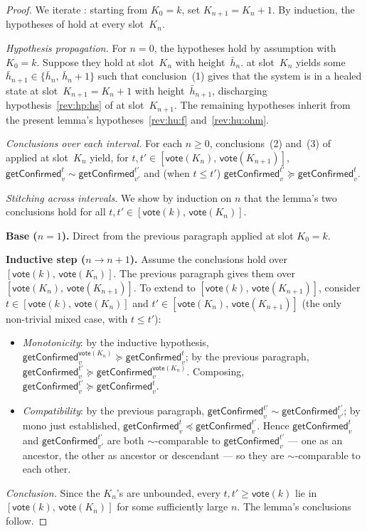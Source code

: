 \documentclass{article}
\newcommand{\vote}{\mathsf{vote}}
\newcommand{\comm}[1]{\bar{#1}}
\newcommand{\getConfirmed}{\textsf{getConfirmed}\xspace}
\theoremstyle{plain}
\theoremstyle{definition}
\theoremstyle{remark}
\begin{document}
\begin{proof}
We iterate : starting from $K_0 = k$, set $K_{n+1} = K_n + 1$. By induction, the hypotheses of  hold at every slot~$K_n$.

\emph{Hypothesis propagation.}
For $n = 0$, the hypotheses hold by assumption with $K_0 = k$. Suppose they hold at slot~$K_n$ with height~$\comm{h}_n$.  at slot~$K_n$ yields some $\comm{h}_{n+1} \in \{\comm{h}_n,\, \comm{h}_n + 1\}$ such that conclusion~(1) gives that the system is in a healed state at slot~$K_{n+1} = K_n + 1$ with height~$\comm{h}_{n+1}$, discharging hypothesis~\ref{rev:hp:hs} of  at slot~$K_{n+1}$. The remaining hypotheses inherit from the present lemma's hypotheses~\ref{rev:hu:f} and~\ref{rev:hu:ohm}.

\emph{Conclusions over each interval.}
For each $n \geq 0$, conclusions~(2) and~(3) of  applied at slot~$K_n$ yield, for $t, t' \in [\vote(K_n),\, \vote(K_{n+1})]$, $\getConfirmed_v^t \sim \getConfirmed_{v'}^{t'}$ and (when $t \leq t'$) $\getConfirmed_v^{t'} \succeq \getConfirmed_v^t$.

\emph{Stitching across intervals.}
We show by induction on $n$ that the lemma's two conclusions hold for all $t, t' \in [\vote(k),\, \vote(K_n)]$.

\textbf{Base ($n = 1$).}
Direct from the previous paragraph applied at slot $K_0 = k$.

\textbf{Inductive step ($n \to n+1$).}
Assume the conclusions hold over $[\vote(k),\, \vote(K_n)]$. The previous paragraph gives them over $[\vote(K_n),\, \vote(K_{n+1})]$. To extend to $[\vote(k),\, \vote(K_{n+1})]$, consider $t \in [\vote(k),\, \vote(K_n)]$ and $t' \in [\vote(K_n),\, \vote(K_{n+1})]$ (the only non-trivial mixed case, with $t \leq t'$):
\begin{itemize}
  \item \emph{Monotonicity}: by the inductive hypothesis, $\getConfirmed_v^{\vote(K_n)} \succeq \getConfirmed_v^t$; by the previous paragraph, $\getConfirmed_v^{t'} \succeq \getConfirmed_v^{\vote(K_n)}$. Composing, $\getConfirmed_v^{t'} \succeq \getConfirmed_v^t$.
  \item \emph{Compatibility}: by the previous paragraph, $\getConfirmed_v^{t'} \sim \getConfirmed_{v'}^{t'}$; by mono just established, $\getConfirmed_v^t \preceq \getConfirmed_v^{t'}$. Hence $\getConfirmed_v^t$ and $\getConfirmed_{v'}^{t'}$ are both $\sim$-comparable to $\getConfirmed_v^{t'}$ — one as an ancestor, the other as ancestor or descendant — so they are $\sim$-comparable to each other.
\end{itemize}

\emph{Conclusion.}
Since the $K_n$'s are unbounded, every $t, t' \geq \vote(k)$ lie in $[\vote(k),\, \vote(K_n)]$ for some sufficiently large $n$. The lemma's conclusions follow.
\end{proof}
\end{document}
